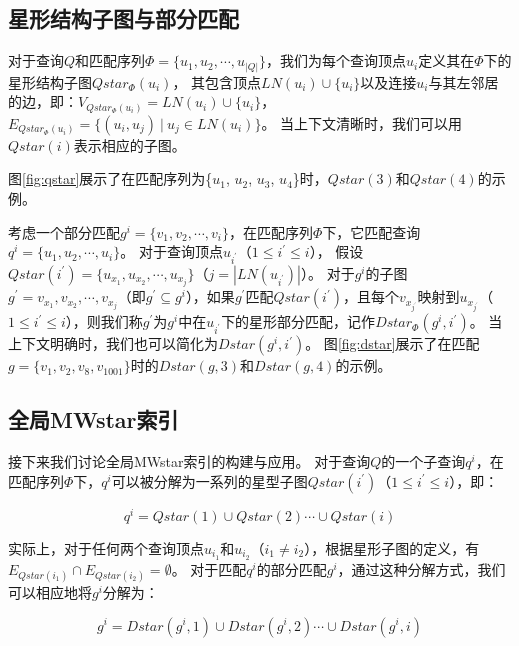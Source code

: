 \subsection{星形结构子图与部分匹配}
\label{mwstar:star_subquery}

\begin{definition}[星形结构子图]\label{def:star-subquery}
对于查询$Q$和匹配序列$\Phi=\{u_1, u_2, \cdots, u_{|Q|} \}$，我们为每个查询顶点$u_i$定义其在$\Phi$下的星形结构子图$Qstar_{\Phi}(u_i)$，
其包含顶点$LN(u_i) \cup \{u_i\}$以及连接$u_i$与其左邻居的边，即：$V_{Qstar_{\Phi}(u_i)} = LN(u_i) \cup \{u_i\}$，$E_{Qstar_{\Phi}(u_i)} = \{(u_i, u_j)\ |\ u_j\in LN(u_i)\}$。
当上下文清晰时，我们可以用$Qstar(i)$表示相应的子图。
\end{definition}

图\ref{fig:qstar}展示了在匹配序列为\{$u_1$, $u_2$, $u_3$, $u_4$\}时，$Qstar(3)$和$Qstar(4)$的示例。

考虑一个部分匹配$g^i=\{v_1, v_2, \cdots, v_i\}$，在匹配序列$\Phi$下，它匹配查询$q^i=\{u_1, u_2, \cdots, u_{i}\}$。
对于查询顶点$u_{i^\prime}$（$1 \leq i^\prime \leq i$），
假设$Qstar(i^\prime) = \{u_{x_1}, u_{x_2}, \cdots, u_{x_j}\}$（$j = |LN(u_{i^\prime})|$）。
对于$g^i$的子图$g^\prime = {v_{x_1}, v_{x_2}, \cdots, v_{x_j}}$（即$g^\prime \subseteq g^i$），如果$g^\prime$匹配$Qstar(i^\prime)$，且每个$v_{x_{j^\prime}}$映射到$u_{x_{j^\prime}}$（$1 \leq i^\prime \leq i$），则我们称$g^\prime$为$g^i$中在$u_{i^\prime}$下的星形部分匹配，记作$Dstar_{\Phi}(g^i, i^\prime)$。
当上下文明确时，我们也可以简化为$Dstar(g^i, i^\prime)$。
图\ref{fig:dstar}展示了在匹配$g=\{v_1, v_2, v_8, v_{1001}\}$时的$Dstar(g, 3)$和$Dstar(g, 4)$的示例。

\subsection{全局MWstar索引}
\label{mwstar:global}

接下来我们讨论全局MWstar索引的构建与应用。
对于查询$Q$的一个子查询$q^i$，在匹配序列$\Phi$下，$q^i$可以被分解为一系列的星型子图$Qstar(i^\prime)$（$1 \leq i^\prime \leq i$），即：

\[
	q^i = Qstar(1)\cup Qstar(2) \cdots \cup Qstar(i)
\]

实际上，对于任何两个查询顶点$u_{i_1}$和$u_{i_2}$（$i_1 \neq i_2$），根据星形子图的定义，有$E_{Qstar(i_1)} \cap E_{Qstar(i_2)} = \emptyset$。
对于匹配$q^i$的部分匹配$g^i$，通过这种分解方式，我们可以相应地将$g^i$分解为：

\begin{equation} \label{equation:dstar-decompose}
    g^i = Dstar(g^i, 1)\cup Dstar(g^i, 2) \cdots \cup Dstar(g^i, i)
\end{equation}


